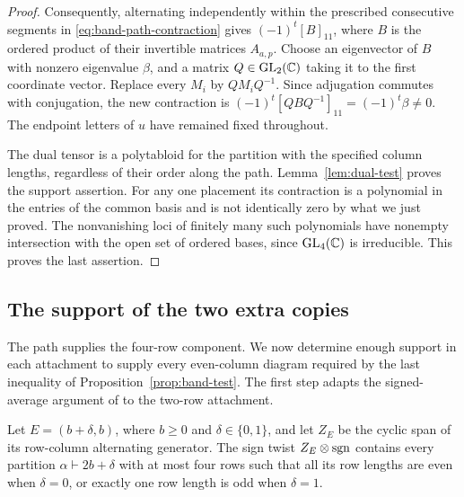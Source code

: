\begin{proof}
Consequently, alternating independently within the prescribed
consecutive segments in \eqref{eq:band-path-contraction} gives
$(-1)^t[B]_{11}$, where $B$ is the ordered product of their
invertible matrices $A_{a,p}$.  Choose an eigenvector of $B$ with
nonzero eigenvalue $\beta$, and a matrix $Q\in\operatorname{GL}_2(\mathbb C)$ taking
it to the first coordinate vector.  Replace every $M_i$ by
$QM_iQ^{-1}$.  Since adjugation commutes with conjugation, the
new contraction is $(-1)^t[QBQ^{-1}]_{11}=(-1)^t\beta\ne0$.
The endpoint letters of $u$ have remained fixed throughout.

The dual tensor is a polytabloid for the partition with the
specified column lengths, regardless of their order along the
path.  Lemma~\ref{lem:dual-test} proves the support assertion.
For any one placement its contraction is a polynomial in the
entries of the common basis and is not identically zero by what
we just proved.  The nonvanishing loci of finitely many such
polynomials have nonempty intersection with the open set of
ordered bases, since $\operatorname{GL}_4(\mathbb C)$ is irreducible.  This proves the
last assertion.
\end{proof}

\subsection{The support of the two extra copies}

The path supplies the four-row component. We now determine enough
support in each attachment to supply every even-column diagram required
by the last inequality of Proposition~\ref{prop:band-test}.
The first step adapts the signed-average argument of
\cite[Section~3]{SaxlCyclic} to the two-row attachment.

\begin{lemma}\label{band:one-extra}
Let $E=(b+\delta,b)$, where $b\ge0$ and $\delta\in\{0,1\}$,
and let $Z_E$ be the cyclic span of its row-column alternating
generator.  The sign twist $Z_E\otimes\operatorname{sgn}$ contains every
partition $\alpha\vdash 2b+\delta$ with at most four rows such
that all its row lengths are even when $\delta=0$, or exactly one
row length is odd when $\delta=1$.
\end{lemma}

